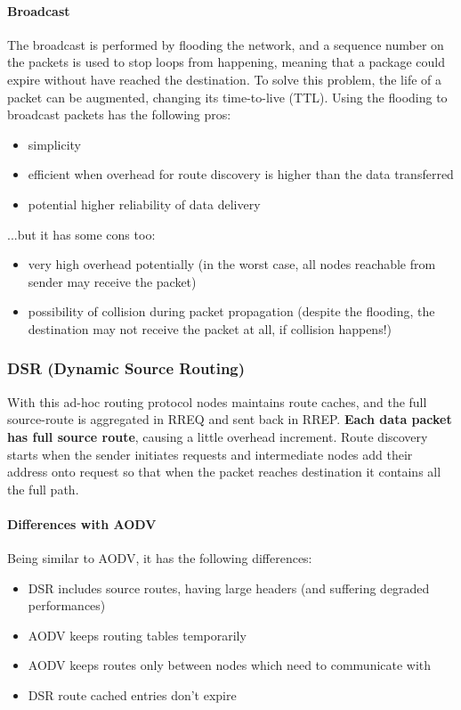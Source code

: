 \paragraph*{Broadcast} The broadcast is performed by flooding the network, and
a sequence number on the packets is used to stop loops from happening, meaning
that a package could expire without have reached the destination. To solve this
problem, the life of a packet can be augmented, changing its time-to-live (TTL).
Using the flooding to broadcast packets has the following pros:
\begin{itemize}
\item simplicity
\item efficient when overhead for route discovery is higher than the data
  transferred
  \item potential higher reliability of data delivery
\end{itemize}
...but it has some cons too:
\begin{itemize}
\item very high overhead potentially (in the worst case, all nodes reachable from
sender may receive the packet)
\item possibility of collision during packet propagation (despite the flooding, the
destination may not receive the packet at all, if collision happens!)
\end{itemize}

\subsubsection{DSR (Dynamic Source Routing)}

With this ad-hoc routing protocol nodes maintains route caches, and the full
source-route is aggregated in RREQ and sent back in RREP. \textbf{Each data packet
has full source route}, causing a little overhead increment.
Route discovery starts when the sender initiates requests and intermediate nodes
add their address onto request so that when the packet reaches destination it
contains all the full path.

\paragraph*{Differences with AODV} Being similar to AODV, it has the following
differences:
\begin{itemize}
\item DSR includes source routes, having large headers (and suffering degraded
  performances)
\item AODV keeps routing tables temporarily
\item AODV keeps routes only between nodes which need to communicate with
\item DSR route cached entries don't expire
\end{itemize}

